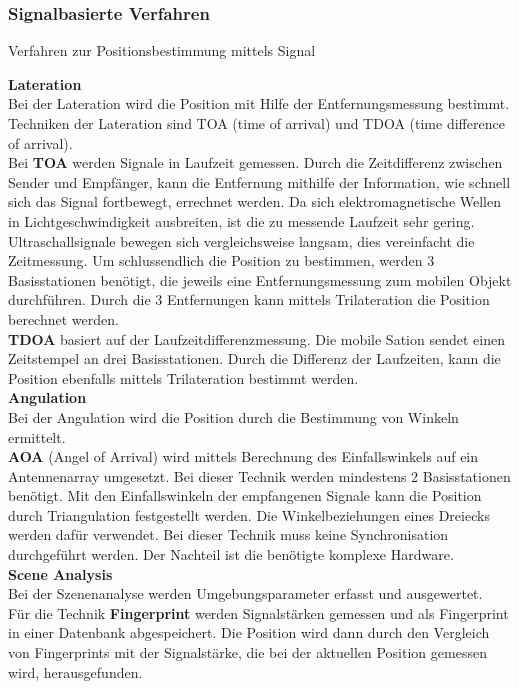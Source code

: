     \subsubsection{Signalbasierte Verfahren}

    Verfahren zur Positionsbestimmung mittels Signal \cite{pos_signal_2} \cite{pos_signal_4}

    \textbf{Lateration}\\
    Bei der Lateration wird die Position mit Hilfe der Entfernungsmessung bestimmt.
    Techniken der Lateration sind TOA (time of arrival) und TDOA (time difference of arrival).\\
    Bei \textbf{TOA} werden Signale in Laufzeit gemessen. Durch die Zeitdifferenz zwischen Sender und Empfänger, kann die Entfernung mithilfe der Information, wie schnell sich das Signal fortbewegt, errechnet werden. Da sich elektromagnetische Wellen in Lichtgeschwindigkeit ausbreiten, ist die zu messende Laufzeit sehr gering. Ultraschallsignale bewegen sich vergleichsweise langsam, dies vereinfacht die Zeitmessung.
    Um schlussendlich die Position zu bestimmen, werden 3 Basisstationen benötigt, die jeweils eine Entfernungsmessung zum mobilen Objekt durchführen. Durch die 3 Entfernungen kann mittels Trilateration die Position berechnet werden.
    \\ %
    \textbf{TDOA} basiert auf der Laufzeitdifferenzmessung.
    Die mobile Sation sendet einen Zeitstempel an drei Basisstationen. Durch die Differenz der Laufzeiten, kann die Position ebenfalls mittels Trilateration bestimmt werden.
    \\ %
    \textbf{Angulation}\\
    Bei der Angulation wird die Position durch die Bestimmung von Winkeln ermittelt. \\
    \textbf{AOA} (Angel of Arrival) wird mittels Berechnung des Einfallswinkels auf ein Antennenarray umgesetzt. Bei dieser Technik werden mindestens 2 Basisstationen benötigt. Mit den Einfallswinkeln der empfangenen Signale kann die Position durch Triangulation festgestellt werden. Die Winkelbeziehungen eines Dreiecks werden dafür verwendet.
    Bei dieser Technik muss keine Synchronisation durchgeführt werden. Der Nachteil ist die benötigte komplexe Hardware.
    \\ %
    \textbf{Scene Analysis}\\
    Bei der Szenenanalyse werden Umgebungsparameter erfasst und ausgewertet.\\
    Für die Technik \textbf{Fingerprint} werden Signalstärken gemessen und als Fingerprint in einer Datenbank abgespeichert. Die Position wird dann durch den Vergleich von Fingerprints mit der Signalstärke, die bei der aktuellen Position gemessen wird, herausgefunden.

